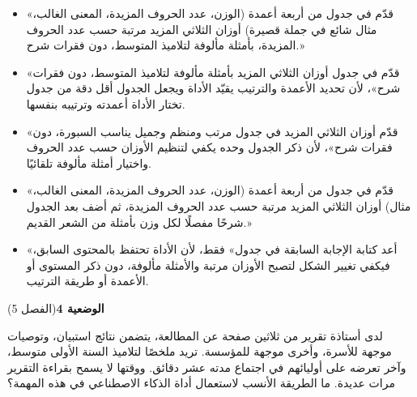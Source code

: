 \documentclass[11pt,a4paper]{article}
\begin{document}
\begin{itemize}[leftmargin=1.0cm, labelsep=6pt, itemsep=3pt, topsep=4pt, parsep=0pt]
  \item[\textbf{أ)}] «قدّم في جدول من أربعة أعمدة (الوزن، عدد الحروف المزيدة، المعنى الغالب، مثال شائع في جملة قصيرة) أوزان الثلاثي المزيد مرتبة حسب عدد الحروف المزيدة، بأمثلة مألوفة لتلاميذ المتوسط، دون فقرات شرح.»
  \item[\textbf{ب)}] «قدّم في جدول أوزان الثلاثي المزيد بأمثلة مألوفة لتلاميذ المتوسط، دون فقرات شرح»، لأن تحديد الأعمدة والترتيب يقيّد الأداة ويجعل الجدول أقل دقة من جدول تختار الأداة أعمدته وترتيبه بنفسها.
  \item[\textbf{ج)}] «قدّم أوزان الثلاثي المزيد في جدول مرتب ومنظم وجميل يناسب السبورة، دون فقرات شرح»، لأن ذكر الجدول وحده يكفي لتنظيم الأوزان حسب عدد الحروف واختيار أمثلة مألوفة تلقائيًا.
  \item[\textbf{د)}] «قدّم في جدول من أربعة أعمدة (الوزن، عدد الحروف المزيدة، المعنى الغالب، مثال) أوزان الثلاثي المزيد مرتبة حسب عدد الحروف المزيدة، ثم أضف بعد الجدول شرحًا مفصلًا لكل وزن بأمثلة من الشعر القديم.»
  \item[\textbf{هـ)}] «أعد كتابة الإجابة السابقة في جدول» فقط، لأن الأداة تحتفظ بالمحتوى السابق، فيكفي تغيير الشكل لتصبح الأوزان مرتبة والأمثلة مألوفة، دون ذكر المستوى أو الأعمدة أو طريقة الترتيب.
\end{itemize}
\par\vspace{6pt}
\noindent
{\large\khatt\textbf{الوضعية 4}}\hfill{\small(الفصل 5)}\par\nopagebreak\vspace{3pt}
\setlength{\fboxsep}{7pt}\colorbox{gray!10}{\parbox{\dimexpr\linewidth-14pt}{لدى أستاذة تقرير من ثلاثين صفحة عن المطالعة، يتضمن نتائج استبيان، وتوصيات موجهة للأسرة، وأخرى موجهة للمؤسسة. تريد ملخصًا لتلاميذ السنة الأولى متوسط، وآخر تعرضه على أوليائهم في اجتماع مدته عشر دقائق. ووقتها لا يسمح بقراءة التقرير مرات عديدة. ما الطريقة الأنسب لاستعمال أداة الذكاء الاصطناعي في هذه المهمة؟}}\par\nopagebreak
\end{document}
